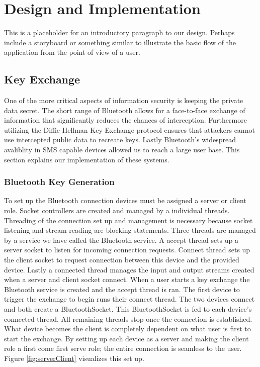 \section{Design and Implementation}
This is a placeholder for an introductory paragraph to our design. Perhaps include a storyboard or something similar to illustrate the basic flow of the application
from the point of view of a user.

\subsection{Key Exchange}
One of the more critical aspects of information security is keeping the private data secret.
The short range of Bluetooth allows for a face-to-face exchange of information that significantly reduces the chances of interception.
Furthermore utilizing the Diffie-Hellman Key Exchange protocol ensures that attackers cannot use intercepted public data to recreate keys.
Lastly Bluetooth's widespread avaliblity in SMS capable devices allowed us to reach a large user base.
This section explains our implementation of these systems.

\subsubsection{Bluetooth Key Generation}
To set up the Bluetooth connection devices must be assigned a server or client role.
Socket controllers are created and managed by a individual threads.
Threading of the connection set up and management is necessary because socket listening and stream reading are blocking statements.
Three threads are managed by a service we have called the Bluetooth service.
A accept thread sets up a server socket to listen for incoming connection requests.
Connect thread sets up the client socket to request connection between this device and the provided device.
Lastly a connected thread manages the input and output streams created when a server and client socket connect.
When a user starts a key exchange the Bluetooth service is created and the accept thread is ran.
The first device to trigger the exchange to begin runs their connect thread.
The two devices connect and both create a BluetoothSocket.
This BluetoothSocket is fed to each device's connected thread.
All remaining threads stop once the connection is established.
What device becomes the client is completely dependent on what user is first to start the exchange.
By setting up each device as a server and making the client role a first come first serve role; the entire connection is seamless to the user.
Figure \ref{fig:serverClient} visualizes this set up.

